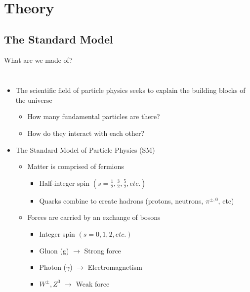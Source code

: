 \documentclass[aspectratio=169,xcolor=table]{beamer}
\begin{document}
\section{Theory }
  
  \subsection{The Standard Model }
  \begin{frame}[t]{What are we made of?}
    \begin{columns}
      \begin{itemize}
        \item The scientific field of particle physics seeks to explain the building blocks of the universe
        \begin{itemize}
          \item How many fundamental particles are there?
          \item How do they interact with each other?
        \end{itemize}
        \item The Standard Model of Particle Physics (SM)
        \begin{itemize}
          \item Matter is comprised of fermions
            \begin{itemize}
              \item Half-integer spin $(s=\frac{1}{2},\frac{3}{2},\frac{5}{2},etc.)$
              \item Quarks combine to create hadrons (protons, neutrons, $\pi^{\pm,0}$, etc)
            \end{itemize}
          \item Forces are carried by an exchange of bosons
            \begin{itemize}
              \item Integer spin $(s=0,1,2,etc.)$
              \item Gluon (g) $\to$ Strong force
              \item Photon ($\gamma$) $\to$ Electromagnetism
              \item $W^{\pm},Z^{0}$ $\to$ Weak force
            \end{itemize}
        \end{itemize}

\end{itemize}
\end{columns}
\end{frame}
\end{document}
